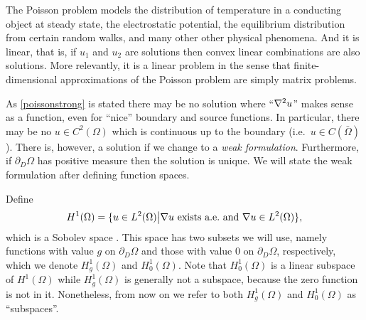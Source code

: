 The Poisson problem models the distribution of temperature in a conducting object at steady state, the electrostatic potential, the equilibrium distribution from certain random walks, and many other other physical phenomena.  And it is linear, that is, if $u_1$ and $u_2$ are solutions then convex linear combinations are also solutions.  More relevantly, it is a linear problem in the sense that finite-dimensional approximations of the Poisson problem are simply matrix problems.

As \eqref{poissonstrong} is stated there may be no solution where ``$\nabla^2 u$'' makes sense as a function, even for ``nice'' boundary and source functions.  In particular, there may be no $u\in C^2(\Omega)$ which is continuous up to the boundary (i.e.~$u\in C(\bar\Omega)$).  There is, however, a solution if we change to a \emph{weak formulation}.  Furthermore, if $\partial_D \Omega$ has positive measure then the solution is unique.  We will state the weak formulation after defining function spaces.

Define
    $$H^1(\Omega) = \{u\in L^2(\Omega) \big| \nabla u \text{ exists a.e.~and } \nabla u \in L^2(\Omega)\},$$
which is a Sobolev space \citep{Evans}.  This space has two subsets we will use, namely functions with value $g$ on $\partial_D \Omega$ and those with value $0$ on $\partial_D \Omega$, respectively, which we denote $H_g^1(\Omega)$ and $H_0^1(\Omega)$.  Note that $H_0^1(\Omega)$ is a linear subspace of $H^1(\Omega)$ while $H_g^1(\Omega)$ is generally not a subspace, because the zero function is not in it.  Nonetheless, from now on we refer to both $H_g^1(\Omega)$ and $H_0^1(\Omega)$ as ``subspaces''.

